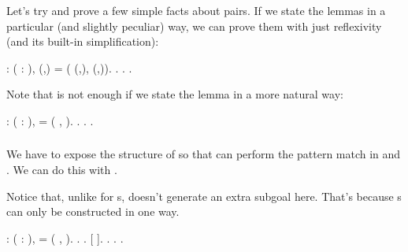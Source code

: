 \documentclass[12pt]{report}
\begin{document}
 Let's try and prove a few simple facts about pairs.  If we
    state the lemmas in a particular (and slightly peculiar) way, we
    can prove them with just reflexivity (and its built-in
    simplification): \begin{coqdoccode}
\coqdocemptyline
\coqdocnoindent
{}  : \coqdockw{\ensuremath{\forall}} (  : ),\coqdoceol
\coqdocindent{1.00em}
(,) = ( (,),  (,)).\coqdoceol
\coqdocnoindent
{}.\coqdoceol
\coqdocindent{1.00em}
. .\coqdoceol
\coqdocemptyline
\end{coqdoccode}
Note that  is not enough if we state the lemma in a
    more natural way: \begin{coqdoccode}
\coqdocemptyline
\coqdocnoindent
{}  : \coqdockw{\ensuremath{\forall}} ( : ),\coqdoceol
\coqdocindent{1.00em}
 = ( ,  ).\coqdoceol
\coqdocnoindent
{}.\coqdoceol
\coqdocindent{1.00em}
. \coqdocnoindent
{}.\coqdoceol
\coqdocemptyline
\end{coqdoccode}
\subsubsection{ }

 We have to expose the structure of  so that  can
    perform the pattern match in  and .  We can do this with
    .


    Notice that, unlike for s,  doesn't generate an
    extra subgoal here.  That's because s can only be
    constructed in one way.  \begin{coqdoccode}
\coqdocemptyline
\coqdocnoindent
{}  : \coqdockw{\ensuremath{\forall}} ( : ),\coqdoceol
\coqdocindent{1.00em}
 = ( ,  ).\coqdoceol
\coqdocnoindent
{}.\coqdoceol
\coqdocindent{1.00em}
 .    [ ]. . . .\coqdoceol
\coqdocemptyline
\end{coqdoccode}
\end{document}
